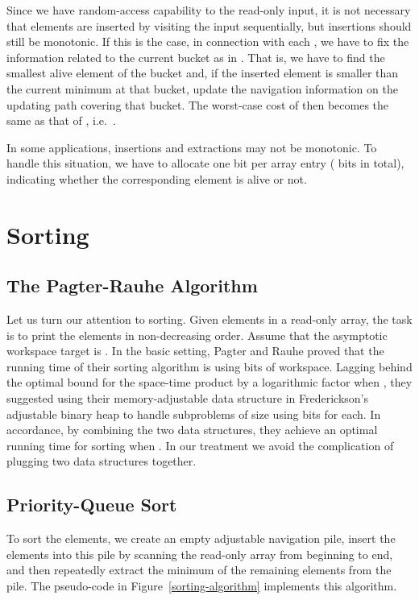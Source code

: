 \documentclass[final,onetabnum,onefignum,onethmnum]{siamltex}
\newcommand{\Insert}{\mbox{}}
\newcommand{\Extract}{\mbox{}}
\begin{document}
Since we have random-access capability to the read-only input, it is
not necessary that elements are inserted by visiting the input
sequentially, but insertions should still be monotonic. If
this is the case, in connection with each \Insert{}, we have to fix
the information related to the current bucket as in \Extract{}. That
is, we have to find the smallest alive element of the bucket and, if
the inserted element is smaller than the current minimum at that
bucket, update the navigation information on the updating path covering
that bucket. The worst-case cost of \Insert{} then becomes
the same as that of \Extract{}, i.e.~.

In some applications, insertions and extractions may 
not be monotonic. To handle this situation, we have to allocate one bit per array entry
( bits in total), indicating whether the corresponding element is alive or not.  

\section{Sorting}
\label{sec:sorting}

\subsection{The Pagter-Rauhe Algorithm}
Let us turn our attention to sorting. Given  elements in
a read-only array, the task is to print the elements in
non-decreasing order. Assume that the asymptotic workspace target is .
In the basic setting, Pagter and Rauhe \cite{PR98} proved that
the running time of their sorting algorithm is 
using  bits of workspace. Lagging behind the optimal bound for
the space-time product by a logarithmic factor when , they suggested using their memory-adjustable data structure in
Frederickson's adjustable binary heap \cite{Fre87} to handle
subproblems of size  using  bits for each.  In
accordance, by combining the two data structures, they
achieve an optimal  running time for sorting
when .  In our treatment we avoid the
complication of plugging two data structures together.

\subsection{Priority-Queue Sort} 
To sort the elements, we create an empty adjustable navigation
pile, insert the elements into this pile by scanning the read-only
array from beginning to end, and then repeatedly extract the minimum of the
remaining elements from the pile. The pseudo-code in
Figure~\ref{sorting-algorithm} implements this algorithm.
\end{document}
